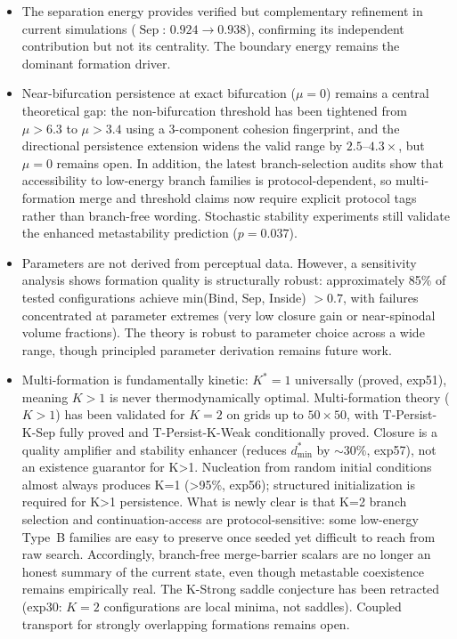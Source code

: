 \documentclass[lettersize,journal]{IEEEtran}
\DeclareMathOperator{\Sep}{Sep}
\begin{document}
\begin{itemize}
\item The separation energy provides verified but complementary refinement in current simulations ($\Sep$: $0.924 \to 0.938$), confirming its independent contribution but not its centrality. The boundary energy remains the dominant formation driver.
\item Near-bifurcation persistence at exact bifurcation ($\mu = 0$) remains a central theoretical gap: the non-bifurcation threshold has been tightened from $\mu > 6.3$ to $\mu > 3.4$ using a 3-component cohesion fingerprint, and the directional persistence extension widens the valid range by $2.5$--$4.3\times$, but $\mu = 0$ remains open. In addition, the latest branch-selection audits show that accessibility to low-energy branch families is protocol-dependent, so multi-formation merge and threshold claims now require explicit protocol tags rather than branch-free wording. Stochastic stability experiments still validate the enhanced metastability prediction ($p = 0.037$).
\item Parameters are not derived from perceptual data. However, a sensitivity analysis shows formation quality is structurally robust: approximately 85\% of tested configurations achieve min(Bind, Sep, Inside) $> 0.7$, with failures concentrated at parameter extremes (very low closure gain or near-spinodal volume fractions). The theory is robust to parameter choice across a wide range, though principled parameter derivation remains future work.
\item Multi-formation is fundamentally kinetic: $K^* = 1$ universally (proved, exp51), meaning $K > 1$ is never thermodynamically optimal. Multi-formation theory ($K > 1$) has been validated for $K = 2$ on grids up to $50 \times 50$, with T-Persist-K-Sep fully proved and T-Persist-K-Weak conditionally proved. Closure is a quality amplifier and stability enhancer (reduces $d_{\min}^*$ by $\sim 30\%$, exp57), not an existence guarantor for K>1. Nucleation from random initial conditions almost always produces K=1 (>95\%, exp56); structured initialization is required for K>1 persistence. What is newly clear is that K=2 branch selection and continuation-access are protocol-sensitive: some low-energy Type~B families are easy to preserve once seeded yet difficult to reach from raw search. Accordingly, branch-free merge-barrier scalars are no longer an honest summary of the current state, even though metastable coexistence remains empirically real. The K-Strong saddle conjecture has been retracted (exp30: $K = 2$ configurations are local minima, not saddles). Coupled transport for strongly overlapping formations remains open.
\end{itemize}
\end{document}
